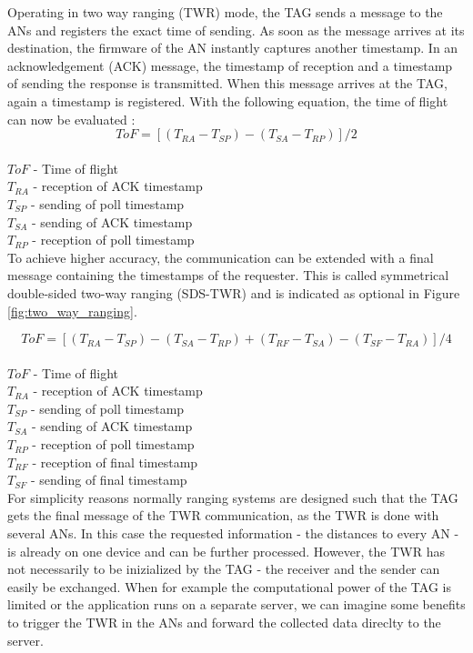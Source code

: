 Operating in two way ranging (TWR) mode, the TAG sends a message to the ANs and registers the exact time of sending. As soon as the message arrives at its destination, the firmware of the AN instantly captures another timestamp. In an acknowledgement (ACK) message, the timestamp of reception and a timestamp of sending the response is transmitted. When this message arrives at the TAG, again a timestamp is registered. With the following equation, the time of flight can now be evaluated \cite{SewioTWR}:
$$ ToF = [(T_{RA}-T_{SP})-(T_{SA}-T_{RP})] / 2$$\\
$ToF$ - Time of flight\\
$T_{RA}$ - reception of ACK timestamp\\
$T_{SP}$ - sending of poll timestamp\\
$T_{SA}$ - sending of ACK timestamp\\
$T_{RP}$ - reception of poll timestamp\\

To achieve higher accuracy, the communication can be extended with a final message containing the timestamps of the requester. This is called symmetrical double-sided two-way ranging (SDS-TWR) and is indicated as optional in Figure \ref{fig:two_way_ranging}.

$$ ToF = [(T_{RA}-T_{SP})-(T_{SA}-T_{RP}) + (T_{RF}-T_{SA})-(T_{SF}-T_{RA}) ]/ 4$$\\
$ToF$ - Time of flight\\
$T_{RA}$ - reception of ACK timestamp\\
$T_{SP}$ - sending of poll timestamp\\
$T_{SA}$ - sending of ACK timestamp\\
$T_{RP}$ - reception of poll timestamp\\
$T_{RF}$ - reception of final timestamp\\
$T_{SF}$ - sending of final timestamp\\

For simplicity reasons normally ranging systems are designed such that the TAG gets the final message of the TWR communication, as the TWR is done with several ANs. In this case the requested information - the distances to every AN - is already on one device and can be further processed. However, the TWR has not necessarily to be inizialized by the TAG - the receiver and the sender can easily be exchanged. When for example the computational power of the TAG is limited or the application runs on a separate server, we can imagine some benefits to trigger the TWR in the ANs and forward the collected data direclty to the server.

